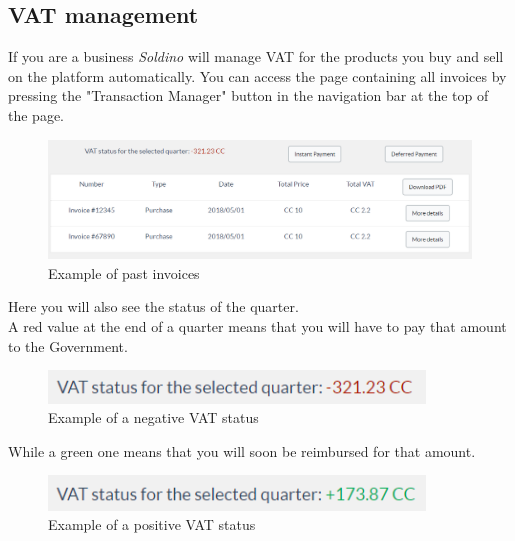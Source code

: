 	\subsection{VAT management}
	If you are a business \textit{Soldino} will manage VAT for the products 
	you buy and sell on the platform automatically. You can access the page 
	containing all invoices by pressing the "Transaction Manager" button 
	in the navigation bar at the top of the page.
	\begin{figure}[H]
		\includegraphics[width=15cm]{res/images/past_invoices.png}
		\centering
		\caption{Example of past invoices}
	\end{figure}
	\noindent Here you will also see the status of the quarter. 
	\\A red value at the end of a quarter means that you will have to pay 
	that amount to the Government.
	\begin{figure}[H]
		\includegraphics[width=10cm]{res/images/negative_vat_status.png}
		\centering
		\caption{Example of a negative VAT status}
	\end{figure}
	\noindent While a green one means that you will 
	soon be reimbursed for that amount.
	\begin{figure}[H]
		\includegraphics[width=10cm]{res/images/positive_vat_status.png}
		\centering
		\caption{Example of a positive VAT status}
	\end{figure}
